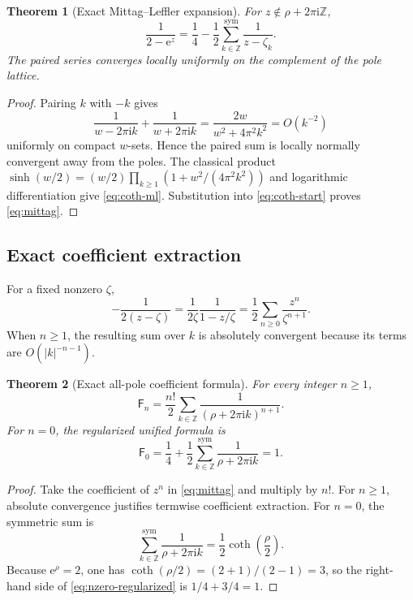 \documentclass[11pt,a4paper,oneside]{article}
\newtheorem{theorem}{Theorem}[section]
\theoremstyle{definition}
\theoremstyle{remark}
\newcommand{\Fub}{\mathsf{F}}
\newcommand{\e}{\mathrm{e}}
\newcommand{\ii}{\mathrm{i}}
\begin{document}
\begin{theorem}[Exact Mittag--Leffler expansion]\label{thm:mittag}
For $z\notin\rho+2\pi\ii\mathbb Z$,
\begin{equation}\label{eq:mittag}
 \frac{1}{2-\e^z}
 =\frac14-\frac12\sum_{k\in\mathbb Z}^{\mathrm{sym}}
   \frac{1}{z-\zeta_k}.
\end{equation}
The paired series converges locally uniformly on the complement of the pole
lattice.
\end{theorem}

\begin{proof}
Pairing $k$ with $-k$ gives
\[
 \frac{1}{w-2\pi\ii k}+\frac{1}{w+2\pi\ii k}
 =\frac{2w}{w^2+4\pi^2k^2}=O(k^{-2})
\]
uniformly on compact $w$-sets.  Hence the paired sum is locally normally
convergent away from the poles.  The classical product
\(
 \sinh(w/2)=(w/2)\prod_{k\ge1}(1+w^2/(4\pi^2k^2))
\)
and logarithmic differentiation give \cref{eq:coth-ml}.  Substitution into
\cref{eq:coth-start} proves \cref{eq:mittag}.
\end{proof}

\subsection{Exact coefficient extraction}
For a fixed nonzero $\zeta$,
\[
 -\frac{1}{2(z-\zeta)}
 =\frac{1}{2\zeta}\frac{1}{1-z/\zeta}
 =\frac12\sum_{n\ge0}\frac{z^n}{\zeta^{n+1}}.
\]
When $n\ge1$, the resulting sum over $k$ is absolutely convergent because its
terms are $O(|k|^{-n-1})$.

\begin{theorem}[Exact all-pole coefficient formula]\label{thm:exact-poles}
For every integer $n\ge1$,
\begin{equation}\label{eq:exact-poles}
 \boxed{\displaystyle
 \Fub_n=\frac{n!}{2}\sum_{k\in\mathbb Z}
       \frac{1}{(\rho+2\pi\ii k)^{n+1}}.}
\end{equation}
For $n=0$, the regularized unified formula is
\begin{equation}\label{eq:nzero-regularized}
 \Fub_0=\frac14+\frac12\sum_{k\in\mathbb Z}^{\mathrm{sym}}
       \frac{1}{\rho+2\pi\ii k}=1.
\end{equation}
\end{theorem}

\begin{proof}
Take the coefficient of $z^n$ in \cref{eq:mittag} and multiply by $n!$.
For $n\ge1$, absolute convergence justifies termwise coefficient extraction.
For $n=0$, the symmetric sum is
\[
 \sum_{k\in\mathbb Z}^{\mathrm{sym}}\frac{1}{\rho+2\pi\ii k}
 =\frac12\coth\!\left(\frac\rho2\right).
\]
Because $\e^\rho=2$, one has
\(
 \coth(\rho/2)=(2+1)/(2-1)=3
\), so the right-hand side of \cref{eq:nzero-regularized} is
$1/4+3/4=1$.
\end{proof}
\end{document}
